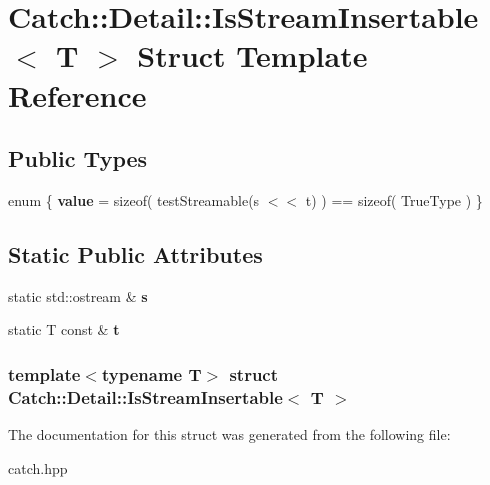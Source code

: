 \hypertarget{structCatch_1_1Detail_1_1IsStreamInsertable}{
\section{Catch::Detail::IsStreamInsertable$<$ T $>$ Struct Template Reference}
\label{structCatch_1_1Detail_1_1IsStreamInsertable}
}
\subsection*{Public Types}
\begin{DoxyCompactItemize}
\item 
enum \{ {\bfseries value} =  sizeof( testStreamable(s $<$$<$ t) ) == sizeof( TrueType )
 \}
\end{DoxyCompactItemize}
\subsection*{Static Public Attributes}
\begin{DoxyCompactItemize}
\item 
\hypertarget{structCatch_1_1Detail_1_1IsStreamInsertable_abe3d3c8e5d85665747faafffc9a96b00}{
static std::ostream \& {\bfseries s}}
\label{structCatch_1_1Detail_1_1IsStreamInsertable_abe3d3c8e5d85665747faafffc9a96b00}

\item 
\hypertarget{structCatch_1_1Detail_1_1IsStreamInsertable_a7d2a3da978b6736667a7b2f6d51f507f}{
static T const \& {\bfseries t}}
\label{structCatch_1_1Detail_1_1IsStreamInsertable_a7d2a3da978b6736667a7b2f6d51f507f}

\end{DoxyCompactItemize}
\subsubsection*{template$<$typename T$>$ struct Catch::Detail::IsStreamInsertable$<$ T $>$}



The documentation for this struct was generated from the following file:\begin{DoxyCompactItemize}
\item 
catch.hpp\end{DoxyCompactItemize}
